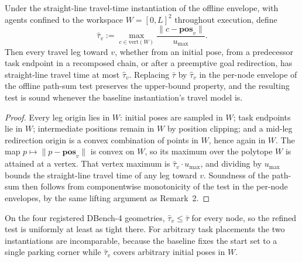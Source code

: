 \begin{lemma}
\label{lem:s1-eccentricity}
Under the straight-line travel-time instantiation of the offline envelope, with
agents confined to the workspace $W = [0, L]^2$ throughout execution, define
\[
\hat\tau_v
  := \max_{c \in \mathrm{vert}(W)}
     \frac{\|c - \mathbf{pos}_v\|}{u_{\max}}.
\]
Then every travel leg toward $v$, whether from an initial pose, from a
predecessor task endpoint in a recomposed chain, or after a preemptive goal
redirection, has straight-line travel time at most $\hat\tau_v$. Replacing
$\bar\tau$ by $\hat\tau_v$ in the per-node envelope of the offline path-sum
test preserves the upper-bound property, and the resulting test is sound
whenever the baseline instantiation's travel model is.
\end{lemma}

\begin{proof}
Every leg origin lies in $W$: initial poses are sampled in $W$; task endpoints
lie in $W$; intermediate positions remain in $W$ by position clipping; and a
mid-leg redirection origin is a convex combination of points in $W$, hence
again in $W$. The map $p \mapsto \|p - \mathbf{pos}_v\|$ is convex on $W$, so
its maximum over the polytope $W$ is attained at a vertex. That vertex maximum
is $\hat\tau_v \cdot u_{\max}$, and dividing by $u_{\max}$ bounds the
straight-line travel time of any leg toward $v$. Soundness of the path-sum then
follows from componentwise monotonicity of the test in the per-node envelopes,
by the same lifting argument as Remark~2.
\end{proof}

\begin{remark}
On the four registered DBench-4 geometries, $\hat\tau_v \le \bar\tau$ for every
node, so the refined test is uniformly at least as tight there. For arbitrary
task placements the two instantiations are incomparable, because the baseline
fixes the start set to a single parking corner while $\hat\tau_v$ covers
arbitrary initial poses in $W$.
\end{remark}

